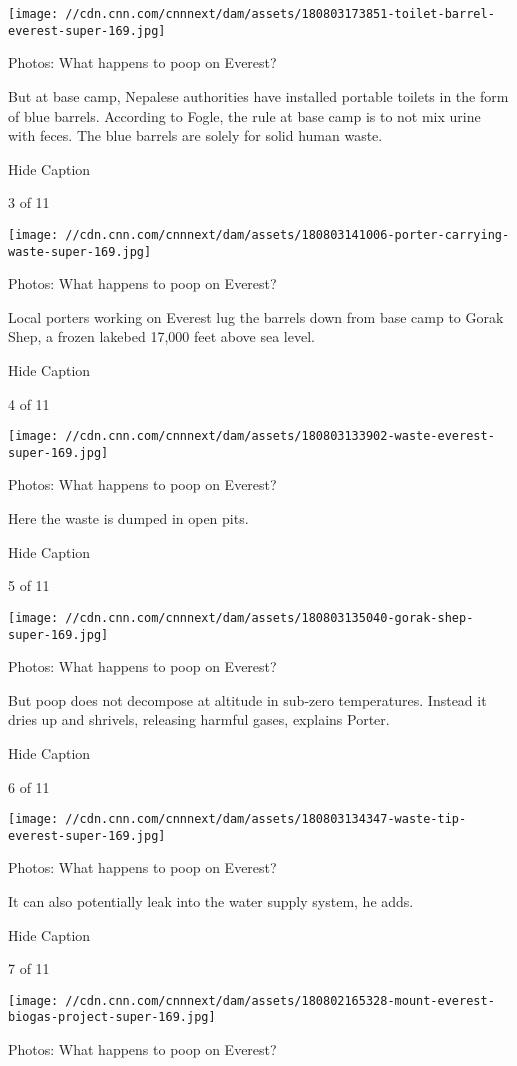 \texttt{[image: //cdn.cnn.com/cnnnext/dam/assets/180803173851-toilet-barrel-everest-super-169.jpg]}

Photos: What happens to poop on Everest?

But at base camp, Nepalese authorities have installed portable toilets
in the form of blue barrels. According to Fogle, the rule at base camp
is to not mix urine with feces. The blue barrels are solely for solid
human waste.

Hide Caption

3 of 11

\texttt{[image: //cdn.cnn.com/cnnnext/dam/assets/180803141006-porter-carrying-waste-super-169.jpg]}

Photos: What happens to poop on Everest?

Local porters working on Everest lug the barrels down from base camp to
Gorak Shep, a frozen lakebed 17,000 feet above sea level.

Hide Caption

4 of 11

\texttt{[image: //cdn.cnn.com/cnnnext/dam/assets/180803133902-waste-everest-super-169.jpg]}

Photos: What happens to poop on Everest?

Here the waste is dumped in open pits.

Hide Caption

5 of 11

\texttt{[image: //cdn.cnn.com/cnnnext/dam/assets/180803135040-gorak-shep-super-169.jpg]}

Photos: What happens to poop on Everest?

But poop does not decompose at altitude in sub-zero temperatures.
Instead it dries up and shrivels, releasing harmful gases, explains
Porter.

Hide Caption

6 of 11

\texttt{[image: //cdn.cnn.com/cnnnext/dam/assets/180803134347-waste-tip-everest-super-169.jpg]}

Photos: What happens to poop on Everest?

It can also potentially leak into the water supply system, he adds.

Hide Caption

7 of 11

\texttt{[image: //cdn.cnn.com/cnnnext/dam/assets/180802165328-mount-everest-biogas-project-super-169.jpg]}

Photos: What happens to poop on Everest?

